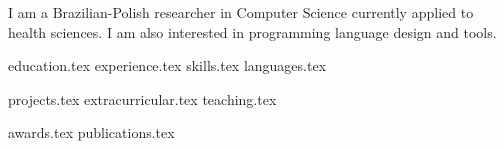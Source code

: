 \documentclass[letterpaper,11pt]{article}
\begin{document}
\newpage


\vspace{0.35cm}
{\justifying
I am a Brazilian-Polish researcher in Computer Science currently applied to health sciences. %
I am also interested in programming language design and tools. %


}

{education.tex}
{experience.tex}
\newpage
\sidebyside
    {{skills.tex}}
    {{languages.tex}}


{projects.tex}
{extracurricular.tex}
{teaching.tex}

{awards.tex}
{publications.tex}
\end{document}
